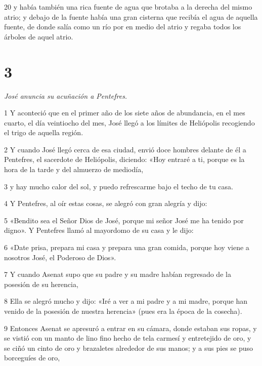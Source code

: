 \par 20 y había también una rica fuente de agua que brotaba a la derecha del mismo atrio; y debajo de la fuente había una gran cisterna que recibía el agua de aquella fuente, de donde salía como un río por en medio del atrio y regaba todos los árboles de aquel atrio.

\chapter{3}

\textit{José anuncia su acuñación a Pentefres.}

\par 1 Y aconteció que en el primer año de los siete años de abundancia, en el mes cuarto, el día veintiocho del mes, José llegó a los límites de Heliópolis recogiendo el trigo de aquella región.

\par 2 Y cuando José llegó cerca de esa ciudad, envió doce hombres delante de él a Pentefres, el sacerdote de Heliópolis, diciendo: «Hoy entraré a ti, porque es la hora de la tarde y del almuerzo de mediodía,

\par 3 y hay mucho calor del sol, y puedo refrescarme bajo el techo de tu casa.

\par 4 Y Pentefres, al oír estas cosas, se alegró con gran alegría y dijo:

\par 5 «Bendito sea el Señor Dios de José, porque mi señor José me ha tenido por digno». Y Pentefres llamó al mayordomo de su casa y le dijo:

\par 6 «Date prisa, prepara mi casa y prepara una gran comida, porque hoy viene a nosotros José, el Poderoso de Dios».

\par 7 Y cuando Asenat supo que su padre y su madre habían regresado de la posesión de su herencia,

\par 8 Ella se alegró mucho y dijo: «Iré a ver a mi padre y a mi madre, porque han venido de la posesión de nuestra herencia» (pues era la época de la cosecha).

\par 9 Entonces Asenat se apresuró a entrar en su cámara, donde estaban sus ropas, y se vistió con un manto de lino fino hecho de tela carmesí y entretejido de oro, y se ciñó un cinto de oro y brazaletes alrededor de sus manos; y a sus pies se puso borceguíes de oro,

